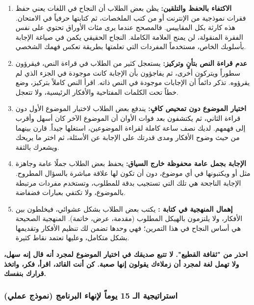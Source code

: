 \documentclass[12pt,a4paper]{book}
\newcommand{\importantAr}[1]{%
	\begin{important}
		\bfseries #1
	\end{important}
}
\begin{document}
	\begin{enumerate}
		\item \textbf{الاكتفاء بالحفظ والتلقين:} يظن بعض الطلاب أن النجاح في اللغات يعني حفظ فقرات نموذجية من الإنترنت أو من كتب الملخصات، ثم كتابتها حرفياً في الامتحان. هذه كارثة بكل المقاييس. فالمصحح عندما يرى مئات الأوراق تحتوي على نفس الفقرة المنقولة، لن يمنح العلامة الكاملة. النجاح الحقيقي يكمن في صياغة الإجابة بأسلوبك الخاص، مستخدماً المفردات التي تعلمتها بطريقة تعكس فهمك الشخصي.
		
		\item \textbf{عدم قراءة النص بتأنٍ وتركيز:} يستعجل كثير من الطلاب في قراءة النص، فيقرؤون سطوراً ويتركون أخرى، ثم يفاجؤون بأن الإجابة كانت موجودة في الجزء الذي لم يقرؤوه. تذكر دائماً أن الإجابات موجودة في النص ذاته. اقرأ النص كاملاً بتركيز، وضع خطاً تحت الكلمات المفتاحية والأفكار الرئيسية، ولا تتعجل.
		
		\item \textbf{اختيار الموضوع دون تمحيص كافٍ:} يندفع بعض الطلاب لاختيار الموضوع الأول دون قراءة الثاني، ثم يكتشفون بعد فوات الأوان أن الموضوع الآخر كان أسهل وأقرب إلى فهمهم. لديك نصف ساعة كاملة لقراءة الموضوعين، استغلها جيداً. قارن بينهما من حيث وضوح الأفكار ومدى قدرتك على الإجابة عن الأسئلة، ثم اختر ما يريحك ويشعرك بالثقة.
		
		\item \textbf{الإجابة بجمل عامة محفوظة خارج السياق:} يحفظ بعض الطلاب جملًا عامة وجاهزة مثل  أو  ويكتبونها في أي موضوع، دون أن تكون لها علاقة مباشرة بالسؤال المطروح. الإجابة الناجحة هي تلك التي تستجيب بدقة للمطلوب، وتستخدم مفردات مرتبطة بالموضوع، ولا تكتفي بعبارات فضفاضة.
		
		\item \textbf{إهمال المنهجية في كتابة :} يكتب بعض الطلاب  بشكل عشوائي، فيخلطون بين الأفكار، ولا يلتزمون بالهيكل المطلوب (مقدمة، عرض، خاتمة). المنهجية الصحيحة هي أساس النجاح في هذا التمرين؛ فهي وحدها تضمن لك تنظيم الأفكار وتقديمها بشكل متكامل، وعليها تعتمد نقاط كثيرة.
	\end{enumerate}
	
	\importantAr{احذر من "ثقافة القطيع". لا تتبع صديقك في اختيار الموضوع لمجرد أنه قال إنه سهل، ولا تهمل لغة لمجرد أن زملاءك يقولون إنها صعبة. كن أنت القائد، اقرأ، فكر، واتخذ قرارك بنفسك.}

	
	\subsubsection{استراتيجية الـ 15 يوماً لإنهاء البرنامج (نموذج عملي)}
	
\end{document}
